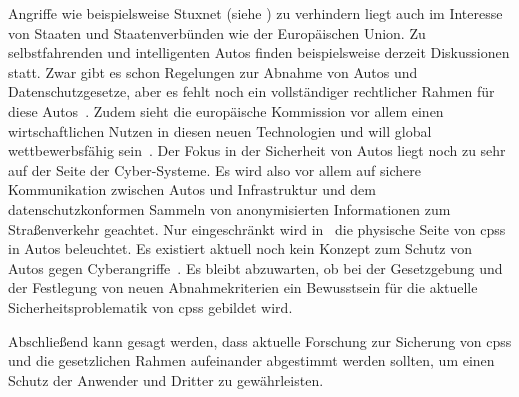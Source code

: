 \documentclass[final,bibliography=totocnumbered]{include/sikseminar}
\newcommand{\cps}{\glspl{cps}\xspace}
\begin{document}
    Angriffe wie beispielsweise Stuxnet (siehe ) zu verhindern liegt auch im Interesse von Staaten und Staatenverbünden wie der Europäischen Union.
    Zu selbstfahrenden und intelligenten Autos finden beispielsweise derzeit Diskussionen statt.
    Zwar gibt es schon Regelungen zur Abnahme von Autos und Datenschutzgesetze, aber es fehlt noch ein vollständiger rechtlicher Rahmen für diese Autos~\cite{EuropeanCommission2018}.
    Zudem sieht die europäische Kommission vor allem einen wirtschaftlichen Nutzen in diesen neuen Technologien und will global wettbewerbsfähig sein~\cite{EuropeanCommission2018}.
    Der Fokus in der Sicherheit von Autos liegt noch zu sehr auf der Seite der Cyber-Systeme.
    Es wird also vor allem auf sichere Kommunikation zwischen Autos und Infrastruktur und dem datenschutzkonformen Sammeln von anonymisierten Informationen zum Straßenverkehr geachtet.
    Nur eingeschränkt wird in~\cite{EuropeanCommission2018} die physische Seite von \cps in Autos beleuchtet.
    Es existiert aktuell noch kein Konzept zum Schutz von Autos gegen Cyberangriffe~\cite{EuropeanCommission2018}.
    Es bleibt abzuwarten, ob bei der Gesetzgebung und der Festlegung von neuen Abnahmekriterien ein Bewusstsein für die aktuelle Sicherheitsproblematik von \cps gebildet wird.

    Abschließend kann gesagt werden, dass aktuelle Forschung zur Sicherung von \cps und die gesetzlichen Rahmen aufeinander abgestimmt werden sollten, um einen Schutz der Anwender und Dritter zu gewährleisten.

    \newpage

    \printbibliography
    \newpage
\end{document}
